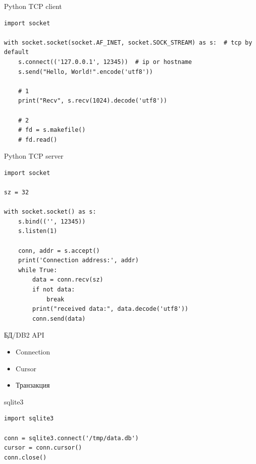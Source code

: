 \documentclass{article}
\begin{document}
\begin{center} Python TCP client \end{center}
\begin{lstlisting}
import socket

with socket.socket(socket.AF_INET, socket.SOCK_STREAM) as s:  # tcp by default
    s.connect(('127.0.0.1', 12345))  # ip or hostname
    s.send("Hello, World!".encode('utf8'))

    # 1
    print("Recv", s.recv(1024).decode('utf8'))

    # 2
    # fd = s.makefile()
    # fd.read()
\end{lstlisting}
\newpage


\begin{center} Python TCP server \end{center}
\begin{lstlisting}
import socket

sz = 32

with socket.socket() as s:
    s.bind(('', 12345))
    s.listen(1)

    conn, addr = s.accept()
    print('Connection address:', addr)
    while True:
        data = conn.recv(sz)
        if not data:
            break
        print("received data:", data.decode('utf8'))
        conn.send(data)
\end{lstlisting}
\newpage

\begin{center} БД/DB2 API \end{center}
\begin{itemize}
    \item Connection
    \item Cursor
    \item Транзакция
\end{itemize}
\newpage

\begin{center} sqlite3 \end{center}
\begin{lstlisting}
import sqlite3

conn = sqlite3.connect('/tmp/data.db')
cursor = conn.cursor()
conn.close()

\end{lstlisting}
\newpage
\end{document}
